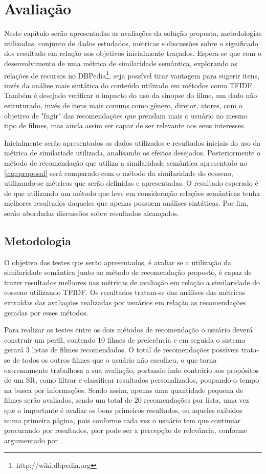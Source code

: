 \chapter{Avaliação}
\label{cap:evaluation}

Neste capítulo serão apresentadas as avaliações da solução proposta, metodologias utilizadas, conjunto de dados estudados, métricas e discussões sobre o significado dos resultado em relação aos objetivos inicialmente traçados. Espera-se que com o desenvolvimento de uma métrica de similaridade semântica, explorando as relações de recursos no DBPedia\footnote{http://wiki.dbpedia.org}, seja possível tirar vantagem para sugerir itens, invés da análise mais sintática do conteúdo utilizado em métodos como \ac{TFIDF}. Também é desejado verificar o impacto do uso da sinopse do filme, um dado não estruturado, invés de itens mais comuns como gênero, diretor, atores, com o objetivo de "fugir" das recomendações que prendam mais o usuário no mesmo tipo de filmes, mas ainda assim ser capaz de ser relevante aos seus interesses.

Inicialmente serão apresentados os dados utilizados e resultados iniciais do uso da métrica de similariade utilizada, analisando os efeitos desejados. Posteriormente o método de recomendação que utiliza a similaridade semântica apresentado no \ref{cap:proposal} será comparado com o método da similaridade do cosseno, utilizando-se métricas que serão definidas e apresentadas. O resultado esperado é de que utilizando um método que leve em consideração relações semânticas tenha melhores resultados daqueles que apenas possuem análises sintáticas. Por fim, serão abordadas discussões sobre resultados alcançados.

\section{Metodologia}

O objetivo dos testes que serão apresentados, é avaliar se a utilização da similaridade semântica junto ao método de recomendação proposto, é capaz de trazer resultados melhores nas métricas de avaliação em relação a similaridade do cosseno utilizando \ac{TFIDF}.  Os resultados tratam-se das análises das métricas extraídas das avaliações realizadas por usuários em relação as recomendações geradas por esses métodos.

Para realizar os testes entre os dois métodos de recomendação o usuário deverá construir um perfil, contendo 10 filmes de preferência e em seguida o sistema gerará 3 listas de filmes recomendados. O total de recomendações possíveis trata-se de todos os outros filmes que o usuário não escolheu, o que torna extremamente trabalhosa a sua avaliação, portando indo contrário aos propósitos de um \ac{SR}, como filtrar e classificar resultados personalizados, poupando-o tempo na busca por informações. Sendo assim, apenas uma quantidade pequena de filmes serão avaliados, sendo um total de 20 recomendações por lista, uma vez que o importante é avaliar os bons primeiros resultados, ou aqueles exibidos numa primeira página, pois conforme cada vez o usuário tem que continuar procurando por resultados, pior pode ser a percepção de relevância, conforme argumentado por \cite{Manning:2008}. 

